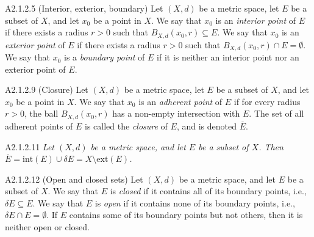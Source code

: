\begin{definition}{A2.1.2.5}
    (Interior, exterior, boundary) Let $(X, d)$ be a metric space, let $E$ be a subset
    of $X$, and let $x_0$ be a point in $X$. We say that $x_0$ is an \emph{interior
    point} of $E$ if there exists a radius $r > 0$ such that $B_{X, d}(x_0, r) \subseteq E$.
    We say that $x_0$ is an \emph{exterior point} of $E$ if there exists a radius $r > 0$
    such that $B_{X, d}(x_0, r) \cap E = \emptyset$. We say that $x_0$ is a \emph{boundary
    point} of $E$ if it is neither an interior point nor an exterior point of $E$.
\end{definition}

\begin{definition}{A2.1.2.9}
    (Closure) Let $(X, d)$ be a metric space, let $E$ be a subset of $X$, and let $x_0$
    be a point in $X$. We say that $x_0$ is an \emph{adherent point} of $E$ if for every
    radius $r > 0$, the ball $B_{X, d}(x_0, r)$ has a non-empty intersection with $E$.
    The set of all adherent points of $E$ is called the \emph{closure} of $E$, and is
    denoted $\overline{E}$.
\end{definition}


\begin{corollary}{A2.1.2.11}
    \emph{Let $(X, d)$ be a metric space, and let $E$ be a subset of $X$. Then
    $\overline{E} = \text{int}(E) \cup \delta E = X \setminus \text{ext}(E)$.}
\end{corollary}

\begin{definition}{A2.1.2.12}
    (Open and closed sets) Let $(X, d)$ be a metric space, and let $E$ be a subset
    of $X$. We say that $E$ is \emph{closed} if it contains all of its boundary
    points, i.e., $\delta E \subseteq E$. We say that $E$ is \emph{open} if it
    contains none of its boundary points, i.e., $\delta E \cap E = \emptyset$. If
    $E$ contains some of its boundary points but not others, then it is neither open
    or closed.
\end{definition}

